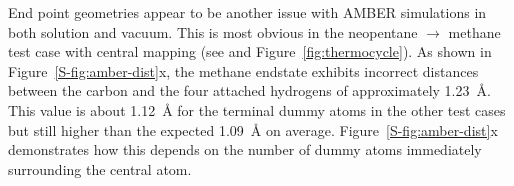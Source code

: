 \documentclass[journal=jctcce,manuscript=article]{achemso}
\begin{document}
End point geometries appear to be another issue with AMBER simulations
in both solution and vacuum.  This is most obvious in the neopentane 
$\rightarrow$ methane test case with central mapping (see 
 and Figure~\ref{fig:thermocycle}).
As shown in Figure~\ref{S-fig:amber-dist}x, the methane endstate exhibits 
incorrect distances between the carbon and the four 
attached hydrogens of approximately \SI{1.23}{\angstrom}.  This value is about 
\SI{1.12}{\angstrom} for the terminal dummy atoms in the other test cases but 
still higher than the expected \SI{1.09}{\angstrom} on average.  
Figure~\ref{S-fig:amber-dist}x demonstrates how this depends on the number of 
dummy atoms immediately surrounding the central atom.
\end{document}
